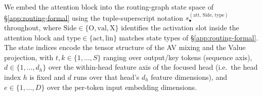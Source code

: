 \documentclass[twoside]{article}
\newcommand{\1}{\mathbf{1}}
\begin{document}
We embed the attention block into the routing-graph state space of \S\ref{app:routing-formal} using
the tuple-superscript notation $s_\bullet^{(\mathrm{att},\,\mathrm{Side},\,\mathrm{type})}$
throughout, where $\mathrm{Side} \in \{\mathrm{O}, \mathrm{val}, \mathrm{X}\}$ identifies the
activation slot inside the attention block and $\mathrm{type} \in \{\mathrm{act}, \mathrm{lin}\}$
matches state types of \S\ref{app:routing-formal}. The state indices encode the tensor structure of
the AV mixing and the Value projection, with $t,k \in \{1,\dots,S\}$ ranging over output/key tokens
(sequence axis), $d \in \{1,\dots,d_h\}$ over the within-head feature axis of the focused head
(i.e.\ the head index $h$ is fixed and $d$ runs over that head's $d_h$ feature dimensions), and $e
    \in \{1,\dots,D\}$ over the per-token input embedding dimensions.
\end{document}

